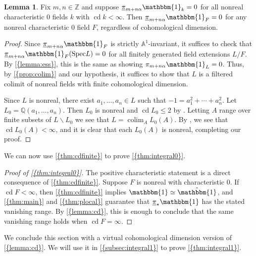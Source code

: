\documentclass[10pt]{amsart}
\numberwithin{equation}{section}
\theoremstyle{plain}
\theoremstyle{definition}
\newtheorem{lemma}[lemma]{Lemma}
\theoremstyle{remark}
\begin{document}
\begin{lemma}\label{lemma:cd}
Fix $m,n\in {\mathbb{Z}}$ and suppose ${\underline{\smash{\pi}}}_{m+n\alpha}{\mathbbm{1}}_k = 0$ for all nonreal characteristic $0$ fields $k$ with ${\operatorname{cd}} k<\infty$.  Then ${\underline{\smash{\pi}}}_{m+n\alpha}{\mathbbm{1}}_F = 0$ for any nonreal characteristic $0$ field $F$, regardless of cohomological dimension.
\end{lemma}
\begin{proof}
Since ${\underline{\smash{\pi}}}_{m+n\alpha}{\mathbbm{1}}_F$ is strictly ${\mathbb{A}}^1$-invariant, it suffices to check that ${\underline{\smash{\pi}}}_{m+n\alpha}{\mathbbm{1}}_F({\operatorname{Spec}} L) = 0$ for all finitely generated field extensions $L/F$.  By {\autoref{{lemma:ess}}}, this is the same as showing $\pi_{m+n\alpha}{\mathbbm{1}}_L = 0$.  Thus, by {\autoref{{prop:colim}}} and our hypothesis, it suffices to show that $L$ is a filtered colimit of nonreal fields with finite cohomological dimension.

Since $L$ is nonreal, there exist $a_1,\ldots,a_n\in L$ such that $-1 = a_1^2+\cdots+a_n^2$.  Let $L_0 = {\mathbb{Q}}(a_1,\ldots,a_n)$.  Then $L_0$ is nonreal and ${\operatorname{cd}} L_0\le 2$ by \cite[\S II.4.4, Proposition 13]{serre:gc}.  Letting $A$ range over finite subsets of $L\smallsetminus L_0$ we see that $L = \operatorname*{\mathrm{colim}}_A L_0(A)$.  By \cite[\S II.4.1 Proposition 10' \& \S II.4.2 Proposition 11]{serre:gc}, we see that ${\operatorname{cd}} L_0(A) < \infty$, and it is clear that each $L_0(A)$ is nonreal, completing our proof.
\end{proof}

We can now use {\autoref{{thm:cdfinite}}} to prove {\autoref{{thm:integral0}}}.

\begin{proof}[Proof of {\autoref{{thm:integral0}}}]
The positive characteristic statement is a direct consequence of {\autoref{{thm:cdfinite}}}.  Suppose $F$ is nonreal with characteristic $0$.  If ${\operatorname{cd}} F<\infty$, then {\autoref{{thm:cdfinite}}} implies ${\mathbbm{1}}\simeq\hat{\mathbbm{1}}$, and {\autoref{{thm:main}}} and {\autoref{{thm:plocal}}} guarantee that ${\underline{\smash{\pi}}}_\star {\mathbbm{1}}$ has the stated vanishing range.  By {\autoref{{lemma:cd}}}, this is enough to conclude that the same vanishing range holds when ${\operatorname{cd}} F = \infty$.
\end{proof}

We conclude this section with a virtual cohomological dimension version of {\autoref{{lemma:cd}}}.  We will use it in {\autoref{{subsec:integral1}}} to prove {\autoref{{thm:integral1}}}.
\end{document}
